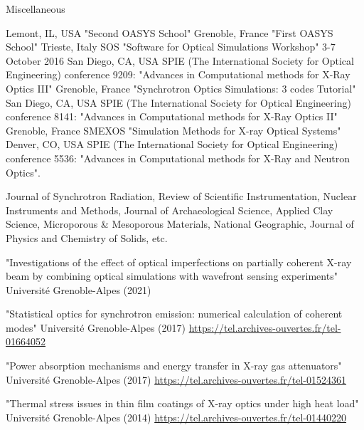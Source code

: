 \begin{rubric}{Miscellaneous }

\entry*[2019/12] Lemont, IL, USA "Second OASYS School"
\entry*[2019/05] Grenoble, France "First OASYS School"
\entry*[2016] Trieste, Italy SOS "Software for Optical Simulations Workshop" 3-7 October 2016
\entry*[2014] San Diego, CA, USA SPIE (The International Society for Optical Engineering) conference 9209: "Advances in Computational methods for X-Ray Optics III"
\entry*[2013] Grenoble, France "Synchrotron Optics Simulations: 3 codes Tutorial"
\entry*[2011] San Diego, CA, USA SPIE (The International Society for Optical Engineering) conference 8141: "Advances in Computational methods for X-Ray Optics II"
\entry*[2009] Grenoble, France SMEXOS "Simulation Methods for X-ray Optical Systems"
\entry*[2004] Denver, CO, USA SPIE (The International Society for Optical Engineering) conference 5536: "Advances in Computational methods for X-Ray and Neutron Optics".

\entry*[] Journal of Synchrotron Radiation, Review of Scientific Instrumentation, Nuclear Instruments and Methods,  Journal of Archaeological Science, Applied Clay Science, Microporous \& Mesoporous Materials, National Geographic, Journal of Physics and Chemistry of Solids, etc.

 "Investigations of the effect of optical imperfections on partially coherent X-ray beam by combining optical simulations with wavefront sensing experiments" Universit\'e Grenoble-Alpes (2021)

 "Statistical optics for synchrotron emission: numerical calculation of coherent modes" Universit\'e Grenoble-Alpes (2017) 
{
\url{https://tel.archives-ouvertes.fr/tel-01664052}}

 "Power absorption mechanisms and energy transfer in X-ray gas attenuators" Universit\'e Grenoble-Alpes (2017) \url{https://tel.archives-ouvertes.fr/tel-01524361}

 "Thermal stress issues in thin film coatings of X-ray optics under high heat load" Universit\'e Grenoble-Alpes (2014) \url{https://tel.archives-ouvertes.fr/tel-01440220}


\end{rubric}
